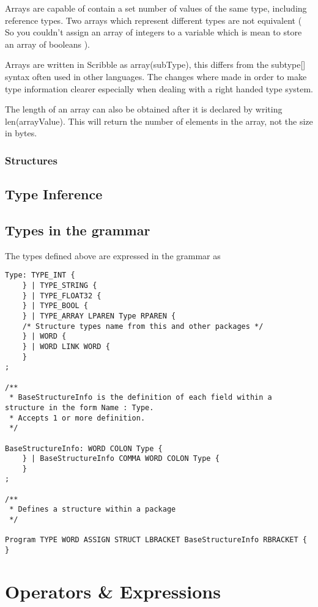 \documentclass[]{final_report}
\begin{document}
Arrays are capable of contain a set number of values of the same type, including reference types. Two arrays which represent different types are not equivalent ( So you couldn't assign an array of integers to a variable which is mean to store an array of booleans ).

Arrays are written in Scribble as array(subType), this differs from the subtype[] syntax often used in other languages. The changes where made in order to make type information clearer especially when dealing with a right handed type system.

The length of an array can also be obtained after it is declared by writing len(arrayValue). This will return the number of elements in the array, not the size in bytes.

\subsection{Structures}



\section{Type Inference}

\section{Types in the grammar}

The types defined above are expressed in the grammar as
\begin{verbatim}
Type: TYPE_INT {
	} | TYPE_STRING {
	} | TYPE_FLOAT32 {
	} | TYPE_BOOL {
	} | TYPE_ARRAY LPAREN Type RPAREN {
	/* Structure types name from this and other packages */	
	} | WORD {
	} | WORD LINK WORD {
	}
;

/**
 * BaseStructureInfo is the definition of each field within a structure in the form Name : Type.
 * Accepts 1 or more definition.
 */

BaseStructureInfo: WORD COLON Type {		
	} | BaseStructureInfo COMMA WORD COLON Type {
	}
;

/**
 * Defines a structure within a package
 */
 
Program TYPE WORD ASSIGN STRUCT LBRACKET BaseStructureInfo RBRACKET {
}

\end{verbatim}

\chapter{Operators \& Expressions}
\end{document}
